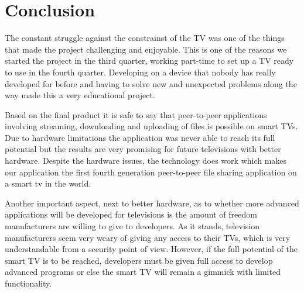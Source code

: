 \chapter{Conclusion}
The constant struggle against the constrainst of the TV was one of the things that made the project challenging and enjoyable. This is one of the reasons we started the project in the third quarter, working part-time to set up a TV ready to use in the fourth quarter. Developing on a device that nobody has really developed for before and having to solve new and unexpected problems along the way made this a very educational project.

Based on the final product it is safe to say that peer-to-peer applications involving streaming, downloading and uploading of files is possible on smart TV\textquotesingle s. Due to hardware limitations the application was never able to reach its full potential but the results are very promising for future televisions with better hardware. Despite the hardware issues, the technology does work which makes our application the first fourth generation peer-to-peer file sharing application on a smart tv in the world.

Another important aspect, next to better hardware, as to whether more advanced applications will be developed for televisions is the amount of freedom manufacturers are willing to give to developers. As it stands, television manufacturers seem very weary of giving any access to their TV\textquotesingle s, which is very understandable from a security point of view. However, if the full potential of the smart TV is to be reached, developers must be given full access to develop advanced programs or else the smart TV will remain a gimmick with limited functionality.